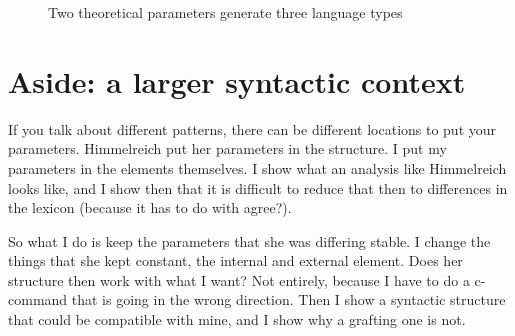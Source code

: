 \begin{figure}[H]
  \centering
    \footnotesize{
    }
    \caption{Two theoretical parameters generate three language types}
    \label{fig:formal-parameters}
\end{figure}

\section{Aside: a larger syntactic context}\label{sec:larger-syntax}

If you talk about different patterns, there can be different locations to put your parameters. Himmelreich put her parameters in the structure. I put my parameters in the elements themselves. I show what an analysis like Himmelreich looks like, and I show then that it is difficult to reduce that then to differences in the lexicon (because it has to do with agree?).

So what I do is keep the parameters that she was differing stable. I change the things that she kept constant, the internal and external element. Does her structure then work with what I want? Not entirely, because I have to do a c-command that is going in the wrong direction.
Then I show a syntactic structure that could be compatible with mine, and I show why a grafting one is not.



